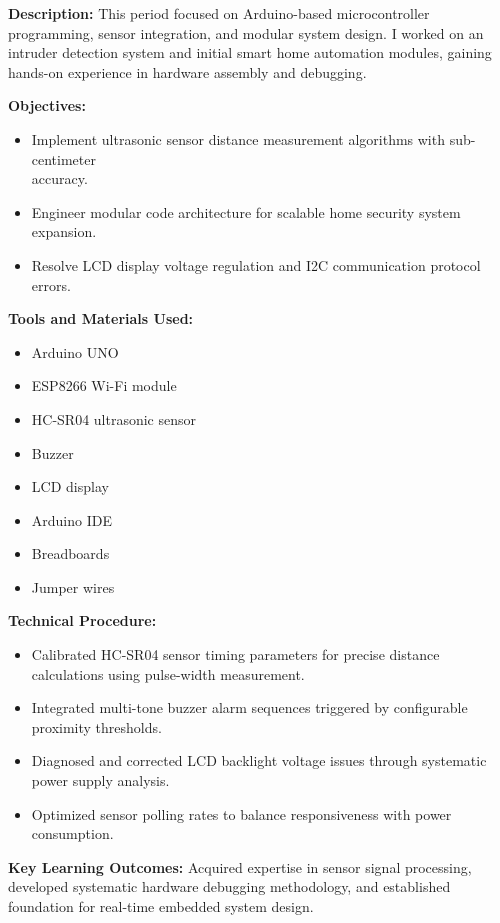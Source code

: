 \documentclass[12pt,a4paper]{report}
\begin{document}
\noindent\textbf{Description:} This period focused on Arduino-based microcontroller programming, sensor integration, and modular system design. I worked on an intruder detection system and initial smart home automation modules, gaining hands-on experience in hardware assembly and debugging.

\noindent\textbf{Objectives:}
\begin{itemize}
    \item Implement ultrasonic sensor distance measurement algorithms with sub-centimeter \\accuracy.
    \item Engineer modular code architecture for scalable home security system expansion.
    \item Resolve LCD display voltage regulation and I2C communication protocol errors.
\end{itemize}

\noindent\textbf{Tools and Materials Used:}
\begin{multicols}{2}
\begin{itemize}
    \item Arduino UNO
    \item ESP8266 Wi-Fi module
    \item HC-SR04 ultrasonic sensor
    \item Buzzer
    \item LCD display
    \item Arduino IDE
    \item Breadboards
    \item Jumper wires
\end{itemize}
\end{multicols}

\noindent\textbf{Technical Procedure:}
\begin{itemize}
    \item Calibrated HC-SR04 sensor timing parameters for precise distance calculations using pulse-width measurement.
    \item Integrated multi-tone buzzer alarm sequences triggered by configurable proximity thresholds.
    \item Diagnosed and corrected LCD backlight voltage issues through systematic power supply analysis.
    \item Optimized sensor polling rates to balance responsiveness with power consumption.
\end{itemize}

\noindent\textbf{Key Learning Outcomes:} Acquired expertise in sensor signal processing, developed systematic hardware debugging methodology, and established foundation for real-time embedded system design.
\end{document}
